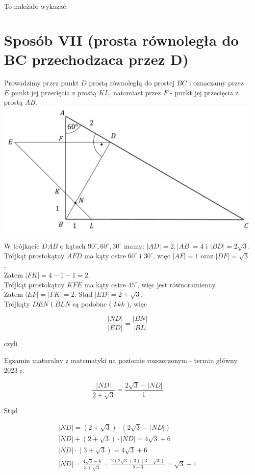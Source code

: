 \documentclass[10pt]{article}
\begin{document}
To należało wykazać.

\section*{Sposób VII (prosta równoległa do BC przechodzaca przez D)}
Prowadzimy przez punkt $D$ prostą równoległą do prostej $B C$ i oznaczamy przez $E$ punkt jej przecięcia z prostą $K L$, natomiast przez $F$ - punkt jej przecięcia z prostą $A B$.\\
\includegraphics[max width=\textwidth, center]{2025_02_07_dcb3d059df06a3930b0ag-13}

W trójkącie $D A B$ o kątach $90^{\circ}, 60^{\circ}, 30^{\circ}$ mamy: $|A D|=2,|A B|=4$ i $|B D|=2 \sqrt{3}$.\\
Trójkąt prostokątny $A F D$ ma kąty ostre $60^{\circ}$ i $30^{\circ}$, więc $|A F|=1$ oraz $|D F|=\sqrt{3}$.\\
Zatem $|F K|=4-1-1=2$.\\
Trójkąt prostokątny $K F E$ ma kąty ostre $45^{\circ}$, więc jest równoramienny.\\
Zatem $|E F|=|F K|=2$. Stąd $|E D|=2+\sqrt{3}$.\\
Trójkąty $D E N$ i $B L N$ są podobne ( $k k k$ ), więc

$$
\frac{|N D|}{|E D|}=\frac{|B N|}{|B L|}
$$

czyli

Egzamin maturalny z matematyki na poziomie rozszerzonym - termin główny 2023 r.

$$
\frac{|N D|}{2+\sqrt{3}}=\frac{2 \sqrt{3}-|N D|}{1}
$$

Stąd

$$
\begin{gathered}
|N D|=(2+\sqrt{3}) \cdot(2 \sqrt{3}-|N D|) \\
|N D|+(2+\sqrt{3}) \cdot|N D|=4 \sqrt{3}+6 \\
|N D| \cdot(3+\sqrt{3})=4 \sqrt{3}+6 \\
|N D|=\frac{4 \sqrt{3}+6}{3+\sqrt{3}}=\frac{2(2 \sqrt{3}+3)(3-\sqrt{3})}{9-3}=\sqrt{3}+1
\end{gathered}
$$
\end{document}
